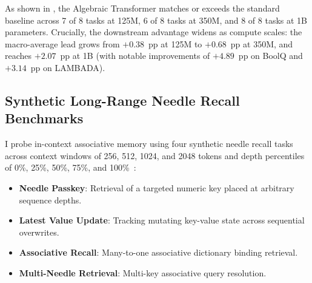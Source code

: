 \documentclass[11pt,a4paper]{article}
\theoremstyle{definition}
\begin{document}
As shown in , the Algebraic Transformer matches or exceeds the standard baseline across 7 of 8 tasks at 125M, 6 of 8 tasks at 350M, and 8 of 8 tasks at 1B parameters. Crucially, the downstream advantage widens as compute scales: the macro-average lead grows from $+0.38$~pp at 125M to $+0.68$~pp at 350M, and reaches $\mathbf{+2.07}$~pp at 1B (with notable improvements of $+4.89$~pp on BoolQ and $+3.14$~pp on LAMBADA).

\subsection{Synthetic Long-Range Needle Recall Benchmarks}
\label{subsec:needle}

I probe in-context associative memory using four synthetic needle recall tasks across context windows of 256, 512, 1024, and 2048 tokens and depth percentiles of 0\%, 25\%, 50\%, 75\%, and 100\%~\citep{kamradt2023needle}:
\begin{itemize}
    \item \textbf{Needle Passkey}: Retrieval of a targeted numeric key placed at arbitrary sequence depths.
    \item \textbf{Latest Value Update}: Tracking mutating key-value state across sequential overwrites.
    \item \textbf{Associative Recall}: Many-to-one associative dictionary binding retrieval.
    \item \textbf{Multi-Needle Retrieval}: Multi-key associative query resolution.
\end{itemize}
\end{document}
